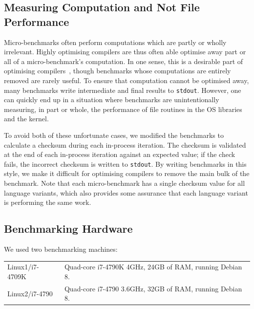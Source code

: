 \documentclass[a4paper,UKenglish]{lipics}
\newcommand{\bencherthree}{Linux1/i7-4709K\xspace}
\newcommand{\bencherfive}{Linux2/i7-4790\xspace}
\newcommand{\benchersix}{OpenBSD/i7-4790\xspace}
\begin{document}
\subsection{Measuring Computation and Not File Performance}

Micro-benchmarks often perform computations which are partly or wholly irrelevant. Highly
optimising compilers are thus often able optimise away part or all of a
micro-benchmark's computation. In one sense, this is a desirable part of
optimising compilers~\cite{seaton15phd}, though benchmarks whose computations
are entirely removed are rarely useful. To ensure that computation cannot
be optimised away, many benchmarks write intermediate and final results
to \texttt{stdout}. However, one can quickly end up in a situation where benchmarks are
unintentionally measuring, in part or whole, the performance of file routines in
the OS libraries and the kernel.

To avoid both of these unfortunate cases,
we modified the benchmarks to calculate a checksum during each in-process iteration.
The checksum is validated at the end of each in-process iteration against an expected
value; if the check fails, the incorrect checksum is written to \texttt{stdout}.
By writing benchmarks in
this style, we make it difficult for optimising compilers to remove the
main bulk of the benchmark. Note that each micro-benchmark has a single checksum value for all
language variants, which also provides some assurance that each language variant is
performing the same work.


\subsection{Benchmarking Hardware}

We used two benchmarking machines:

\begin{tabular}{ll}
  \bencherthree & Quad-core i7-4790K 4GHz, 24GB of RAM, running Debian 8. \\
  \bencherfive  & Quad-core i7-4790 3.6GHz, 32GB of RAM, running Debian 8.
\end{tabular}
\end{document}
